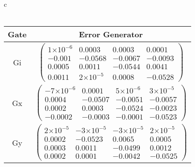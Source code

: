 \documentclass{beamer}
\providecommand{\e}[1]{\ensuremath{\times 10^{#1}}}
\begin{document}
\begin{frame}
\begin{table}[h]
\begin{center}
{\begin{tabular}{c}
\\
\vspace{2em}
\\
\begin{tabular}[l]{|c|c|}
\hline
Gate & Error Generator \\ \hline
Gi & $ \left(\!\!\begin{array}{cccc}
1\e{-6} & 0.0003 & 0.0003 & 0.0001 \\ 
-0.001 & -0.0568 & -0.0067 & -0.0093 \\ 
0.0005 & 0.0011 & -0.0544 & 0.0041 \\ 
0.0011 & 2\e{-5} & 0.0008 & -0.0528
 \end{array}\!\!\right) $
 \\ \hline
Gx & $ \left(\!\!\begin{array}{cccc}
-7\e{-6} & 0.0001 & 5\e{-6} & 3\e{-5} \\ 
0.0004 & -0.0507 & -0.0051 & -0.0057 \\ 
0.0002 & 0.0003 & -0.0524 & -0.0023 \\ 
-0.0002 & -0.0003 & -0.0001 & -0.0523
 \end{array}\!\!\right) $
 \\ \hline
Gy & $ \left(\!\!\begin{array}{cccc}
2\e{-5} & -3\e{-5} & -3\e{-5} & 2\e{-5} \\ 
0.0002 & -0.0523 & 0.0065 & 0.0005 \\ 
0.0003 & 0.0011 & -0.0499 & 0.0012 \\ 
0.0002 & 0.0001 & -0.0042 & -0.0525
 \end{array}\!\!\right) $
 \\ \hline
\end{tabular}

\end{tabular}
}
\end{center}
\end{table}

\end{frame}
\end{document}
